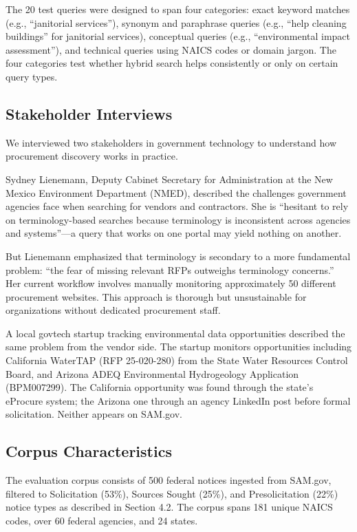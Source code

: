 \documentclass[10pt,twocolumn]{article}
\begin{document}
The 20 test queries were designed to span four categories: exact keyword matches (e.g., ``janitorial services''), synonym and paraphrase queries (e.g., ``help cleaning buildings'' for janitorial services), conceptual queries (e.g., ``environmental impact assessment''), and technical queries using NAICS codes or domain jargon. The four categories test whether hybrid search helps consistently or only on certain query types.

\subsection{Stakeholder Interviews}

We interviewed two stakeholders in government technology to understand how procurement discovery works in practice.

Sydney Lienemann, Deputy Cabinet Secretary for Administration at the New Mexico Environment Department (NMED), described the challenges government agencies face when searching for vendors and contractors. She is ``hesitant to rely on terminology-based searches because terminology is inconsistent across agencies and systems''---a query that works on one portal may yield nothing on another.

But Lienemann emphasized that terminology is secondary to a more fundamental problem: ``the fear of missing relevant RFPs outweighs terminology concerns.'' Her current workflow involves manually monitoring approximately 50 different procurement websites. This approach is thorough but unsustainable for organizations without dedicated procurement staff.

A local govtech startup tracking environmental data opportunities described the same problem from the vendor side. The startup monitors opportunities including California WaterTAP (RFP 25-020-280) from the State Water Resources Control Board, and Arizona ADEQ Environmental Hydrogeology Application (BPM007299). The California opportunity was found through the state's eProcure system; the Arizona one through an agency LinkedIn post before formal solicitation. Neither appears on SAM.gov.

\subsection{Corpus Characteristics}

The evaluation corpus consists of 500 federal notices ingested from SAM.gov, filtered to Solicitation (53\%), Sources Sought (25\%), and Presolicitation (22\%) notice types as described in Section 4.2. The corpus spans 181 unique NAICS codes, over 60 federal agencies, and 24 states.
\end{document}
